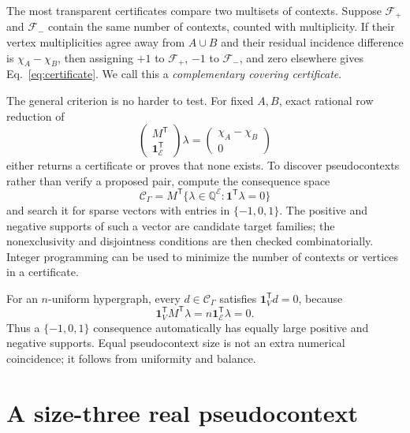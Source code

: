 \documentclass[
  twocolumn,
  aps,
  pra,
  floatfix,
  amsmath,amssymb,
  longbibliography
]{revtex4-2}
\theoremstyle{definition}
\theoremstyle{remark}
\newcommand{\E}{\mathcal E}
\newcommand{\one}{\mathbf 1}
\begin{document}
The most transparent certificates compare two multisets of contexts.
Suppose $\mathcal F_+$ and $\mathcal F_-$ contain the same number of
contexts, counted with multiplicity.  If their vertex multiplicities agree
away from $A\cup B$ and their residual incidence difference is
$\chi_A-\chi_B$, then assigning $+1$ to $\mathcal F_+$, $-1$ to
$\mathcal F_-$, and zero elsewhere gives Eq.~\eqref{eq:certificate}.  We call
this a \emph{complementary covering certificate}.

The general criterion is no harder to test.  For fixed $A,B$, exact rational
row reduction of
\begin{equation}
 \begin{pmatrix}M^{\mathsf T}\\ \one_\E^{\mathsf T}\end{pmatrix}\lambda
 =
 \begin{pmatrix}\chi_A-\chi_B\\0\end{pmatrix}
 \label{eq:algorithm}
\end{equation}
either returns a certificate or proves that none exists.  To discover
pseudocontexts rather than verify a proposed pair, compute the consequence
space
\begin{equation}
 \mathcal C_\Gamma
 =M^{\mathsf T}\{\lambda\in\mathbb Q^{\E}:
                   \one^{\mathsf T}\lambda=0\}
 \label{eq:consequence-space}
\end{equation}
and search it for sparse vectors with entries in $\{-1,0,1\}$.  The positive
and negative supports of such a vector are candidate target families; the
nonexclusivity and disjointness conditions are then checked combinatorially.
Integer programming can be used to minimize the number of contexts or
vertices in a certificate.

For an $n$-uniform hypergraph, every $d\in\mathcal C_\Gamma$ satisfies
$\one_V^{\mathsf T}d=0$, because
\[
 \one_V^{\mathsf T}M^{\mathsf T}\lambda
 =n\one_\E^{\mathsf T}\lambda=0.
\]
Thus a $\{-1,0,1\}$ consequence automatically has equally large positive
and negative supports.  Equal pseudocontext size is not an extra numerical
coincidence; it follows from uniformity and balance.

\section{A size-three real pseudocontext}
\label{sec:mayet}
\end{document}
